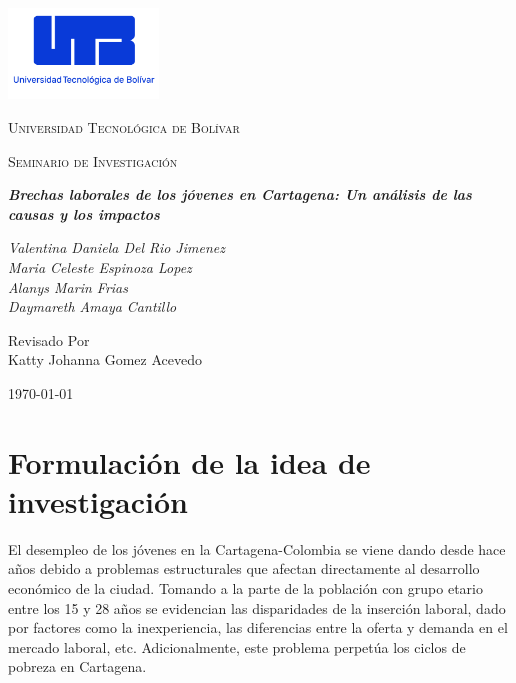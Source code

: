 \documentclass[letterpaper, 12pt]{article}
\begin{document}
\begin{titlepage}
      \centering
      \includegraphics[width=0.3\textwidth]{Images/logo_utb.png}\par\vspace{1cm}
      {\scshape\LARGE Universidad Tecnológica de Bolívar \par}
      \vspace{1cm}

      {\scshape\Large Seminario de Investigación \par}
      \vspace{1cm}

      \slshape {\Large \bfseries{}Brechas laborales de los jóvenes en Cartagena: Un análisis de las causas y los impactos \\}
      \vspace{3cm}

      \slshape {\itshape{} Valentina Daniela Del Rio Jimenez \\}
      \slshape {\itshape{} Maria Celeste Espinoza Lopez \\}
      \slshape {\itshape{} Alanys Marin Frias \\}
      \slshape {\itshape{} Daymareth Amaya Cantillo \\}
      
      \vfill
      Revisado Por \\
      Katty Johanna Gomez Acevedo \\
      {\large \today\par}
\end{titlepage}

\nocite{*}


\newpage

\tableofcontents
\newpage

\section{Formulación de la idea de investigación}

El desempleo de los jóvenes en la Cartagena-Colombia se viene dando 
desde hace años debido a problemas estructurales que afectan directamente
al desarrollo económico de la ciudad. Tomando a la parte de la población 
con grupo etario entre los 15 y 28 años se evidencian las disparidades de 
la inserción laboral, dado por factores como la inexperiencia, las diferencias entre la oferta y demanda en el mercado laboral, etc. 
Adicionalmente, este problema perpetúa los ciclos de pobreza en Cartagena. 
\end{document}
